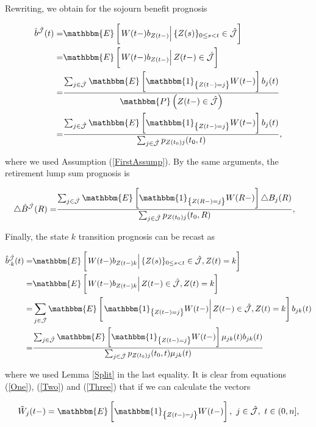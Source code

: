 \documentclass{article}
\newcommand{\1}[1]{\mathbbm{1}_{\left\lbrace #1 \right\rbrace}}
\newcommand{\expec}[1][def]{\mathbbm{E} \left[ #1 \right]}
\newcommand{\econd}[2][def]{\mathbbm{E} \left[ \left. #1 \right| #2 \right]}
\newcommand{\probability}[1][def]{\mathbbm{P} \left( #1 \right)}
\theoremstyle{break}
\theoremstyle{remark}
\numberwithin{equation}{section}
\begin{document}
Rewriting, we obtain for the sojourn benefit prognosis

\begin{align} \label{One}
	 \hat{b}^{\hat{\mathcal{J}}}(t) =& \econd[W(t-)b_{Z(t-)}]{\{Z(s) \}_{0 \leq s < t} \in \hat{\mathcal{J}}} \nonumber \\
	 =& \econd[W(t-)b_{Z(t-)}]{Z(t-) \in \hat{\mathcal{J}}} \nonumber \\
	 =&\frac{\sum_{j \in \hat{\mathcal{J}}} \expec[\1{Z(t-)=j} W(t-)] b_j(t)}{\probability[Z(t-) \in \hat{\mathcal{J}}]} \nonumber \\
	 =&\frac{\sum_{j \in \hat{\mathcal{J}}} \expec[\1{Z(t-)=j} W(t-)] b_j(t)}{\sum_{j \in \hat{\mathcal{J}}} p_{Z(t_0)j}(t_0,t)},
\end{align}

where we used Assumption (\ref{FirstAssump}). By the same arguments, the retirement lump sum prognosis is

\begin{align} \label{Two}
\triangle \hat{B}^{\hat{\mathcal{J}}}(R) =& \frac{\sum_{j \in \hat{\mathcal{J}}} \expec[\1{Z(R-)=j} W(R-)] \triangle B_j(R)}{\sum_{j \in \hat{\mathcal{J}}} p_{Z(t_0)j}(t_0,R)},
\end{align}

Finally, the state $k$ transition prognosis can be recast as

\begin{align} \label{Three}
\hat{b}_{\cdot k}^{\hat{\mathcal{J}}}(t) =& \econd[W(t-)b_{Z(t-)k}]{\{Z(s) \}_{0 \leq s < t} \in \hat{\mathcal{J}}, Z(t)=k} \nonumber \\
=& \econd[W(t-)b_{Z(t-)k}]{Z(t-) \in \hat{\mathcal{J}}, Z(t)=k} \nonumber \\
=& \sum_{j \in \hat{\mathcal{J}}} \econd[\1{Z(t-)=j} W(t-)]{Z(t-) \in \hat{\mathcal{J}}, Z(t) = k} b_{jk}(t) \nonumber \\
=& \frac{\sum_{j \in \hat{\mathcal{J}}} \expec[\1{Z(t-)=j} W(t-)] \mu_{jk}(t) b_{jk}(t)}{\sum_{j \in \hat{\mathcal{J}}} p_{Z(t_0)j}(t_0,t) \mu_{jk}(t)}
\end{align}

where we used Lemma \ref{Split} in the last equality. It is clear from equations (\ref{One}), (\ref{Two}) and (\ref{Three}) that if we can calculate the vectors

\begin{align*}
\tilde{W}_j(t-) = \expec[\1{Z(t-)=j} W(t-)], \, \, j \in \hat{\mathcal{J}}, \, \, t \in (0,n],
\end{align*}
\end{document}
